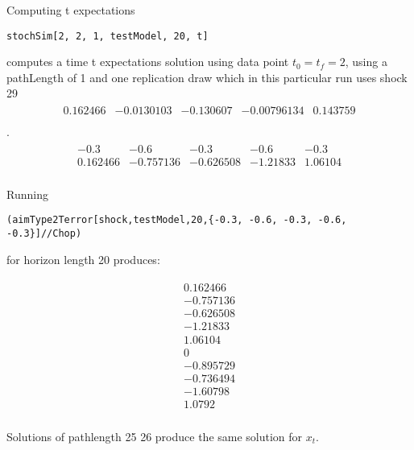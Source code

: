 Computing t expectations 


\begin{verbatim}
stochSim[2, 2, 1, testModel, 20, t]
\end{verbatim}
computes a time t expectations solution  using data point $t_0=t_f=2$, using a pathLength of 1 and one replication draw 
which in this particular run uses
shock {29}
\begin{gather*}\begin{array}{ccccc}
 0.162466 & -0.0130103 & -0.130607 & -0.00796134 & 0.143759 \\
\end{array}
\end{gather*}
.
\begin{gather*}\begin{array}{ccccc}
 -0.3 & -0.6 & -0.3 & -0.6 & -0.3 \\
 0.162466 & -0.757136 & -0.626508 & -1.21833 & 1.06104 \\
\end{array}
\end{gather*}







Running 
\begin{verbatim}
(aimType2Terror[shock,testModel,20,{-0.3, -0.6, -0.3, -0.6, -0.3}]//Chop)
\end{verbatim}
for horizon length 20 produces:





{\small
\begin{gather*}\begin{array}{c}
 0.162466 \\
 -0.757136 \\
 -0.626508 \\
 -1.21833 \\
 1.06104 \\
 0 \\
 -0.895729 \\
 -0.736494 \\
 -1.60798 \\
 1.0792 \\
\end{array}
\end{gather*}
}



Solutions of pathlength 25 26 produce the same solution for $x_t$.



